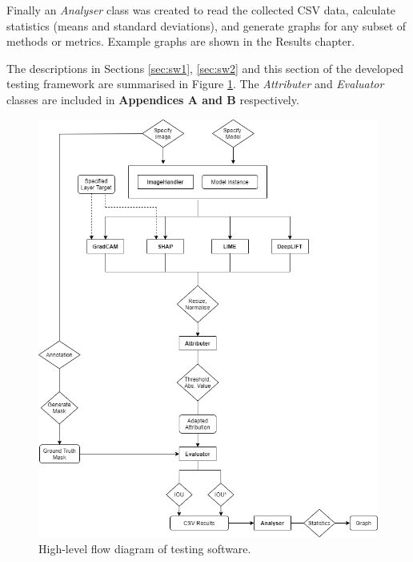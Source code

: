 \documentclass[main]{subfiles}
\begin{document}
Finally an \textit{Analyser} class was created to read the collected CSV data, calculate statistics (means and standard deviations), and generate graphs for any subset of methods or metrics. Example graphs are shown in the Results chapter.

The descriptions in Sections \ref{sec:sw1}, \ref{sec:sw2} and this section of the developed testing framework are summarised in Figure \ref{flow_image}. The \textit{Attributer} and \textit{Evaluator} classes are included in \textbf{Appendices A and B} respectively.


\begin{figure}[htbp]
\centering
\includegraphics[scale=0.6]{program_flow.png}
\caption{High-level flow diagram of testing software.}
\label{flow_image}
\end{figure}
\end{document}
